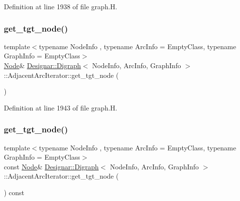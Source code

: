 Definition at line 1938 of file graph.\+H.

\mbox{\label{class_designar_1_1_digraph_1_1_adjacent_arc_iterator_ad1df4c6624e411ea5ec10ee3d1414b1c}} 
\subsubsection{\texorpdfstring{get\+\_\+tgt\+\_\+node()}{get\_tgt\_node()}\hspace{0.1cm}{\footnotesize\ttfamily [1/2]}}
{\footnotesize\ttfamily template$<$typename Node\+Info , typename Arc\+Info  = Empty\+Class, typename Graph\+Info  = Empty\+Class$>$ \\
\hyperlink{class_designar_1_1_digraph_a4dc921c41a480b7946a04170e997d8ae}{Node}\& \hyperlink{class_designar_1_1_digraph}{Designar\+::\+Digraph}$<$ Node\+Info, Arc\+Info, Graph\+Info $>$\+::Adjacent\+Arc\+Iterator\+::get\+\_\+tgt\+\_\+node (\begin{DoxyParamCaption}{ }\end{DoxyParamCaption})\hspace{0.3cm}{\ttfamily [inline]}}



Definition at line 1943 of file graph.\+H.

\mbox{\label{class_designar_1_1_digraph_1_1_adjacent_arc_iterator_a3b5e320227b6456e9b0de9d505e0eae4}} 
\subsubsection{\texorpdfstring{get\+\_\+tgt\+\_\+node()}{get\_tgt\_node()}\hspace{0.1cm}{\footnotesize\ttfamily [2/2]}}
{\footnotesize\ttfamily template$<$typename Node\+Info , typename Arc\+Info  = Empty\+Class, typename Graph\+Info  = Empty\+Class$>$ \\
const \hyperlink{class_designar_1_1_digraph_a4dc921c41a480b7946a04170e997d8ae}{Node}\& \hyperlink{class_designar_1_1_digraph}{Designar\+::\+Digraph}$<$ Node\+Info, Arc\+Info, Graph\+Info $>$\+::Adjacent\+Arc\+Iterator\+::get\+\_\+tgt\+\_\+node (\begin{DoxyParamCaption}{ }\end{DoxyParamCaption}) const\hspace{0.3cm}{\ttfamily [inline]}}



